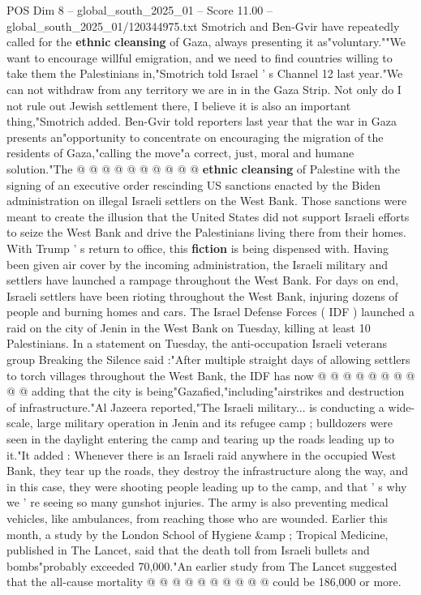 \begin{textsample}{POS Dim 8 – global\_south\_2025\_01 – Score 11.00 – global\_south\_2025\_01/120344975.txt}
Smotrich and Ben-Gvir have repeatedly called for the \textbf{ethnic} \textbf{cleansing} of Gaza, always presenting it as"voluntary.""We want to encourage willful emigration, and we need to find countries willing to take them the Palestinians in,"Smotrich told Israel ' s Channel 12 last year."We can not withdraw from any territory we are in in the Gaza Strip.
Not only do I not rule out Jewish settlement there, I believe it is also an important thing,"Smotrich added.
Ben-Gvir told reporters last year that the war in Gaza presents an"opportunity to concentrate on encouraging the migration of the residents of Gaza,"calling the move"a correct, just, moral and humane solution."The @ @ @ @ @ @ @ @ @ @ \textbf{ethnic} \textbf{cleansing} of Palestine with the signing of an executive order rescinding US sanctions enacted by the Biden administration on illegal Israeli settlers on the West Bank.
Those sanctions were meant to create the illusion that the United States did not support Israeli efforts to seize the West Bank and drive the Palestinians living there from their homes.
With Trump ' s return to office, this \textbf{fiction} is being dispensed with.
Having been given air cover by the incoming administration, the Israeli military and settlers have launched a rampage throughout the West Bank.
For days on end, Israeli settlers have been rioting throughout the West Bank, injuring dozens of people and burning homes and cars.
The Israel Defense Forces ( IDF ) launched a raid on the city of Jenin in the West Bank on Tuesday, killing at least 10 Palestinians.
In a statement on Tuesday, the anti-occupation Israeli veterans group Breaking the Silence said :"After multiple straight days of allowing settlers to torch villages throughout the West Bank, the IDF has now @ @ @ @ @ @ @ @ @ @ adding that the city is being"Gazafied,"including"airstrikes and destruction of infrastructure."Al Jazeera reported,"The Israeli military... is conducting a wide-scale, large military operation in Jenin and its refugee camp ; bulldozers were seen in the daylight entering the camp and tearing up the roads leading up to it."It added : Whenever there is an Israeli raid anywhere in the occupied West Bank, they tear up the roads, they destroy the infrastructure along the way, and in this case, they were shooting people leading up to the camp, and that ' s why we ' re seeing so many gunshot injuries.
The army is also preventing medical vehicles, like ambulances, from reaching those who are wounded.
Earlier this month, a study by the London School of Hygiene \&amp ; Tropical Medicine, published in The Lancet, said that the death toll from Israeli bullets and bombs"probably exceeded 70,000."An earlier study from The Lancet suggested that the all-cause mortality @ @ @ @ @ @ @ @ @ @ could be 186,000 or more.

\end{textsample}
